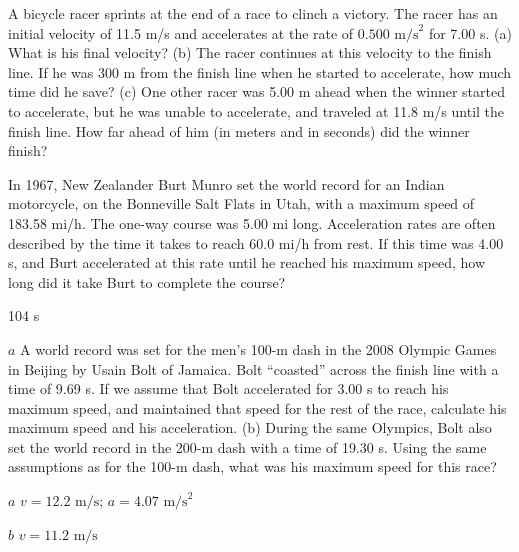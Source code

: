 \documentclass[
]{book}
\newenvironment{problems-exercises}{}{}
\begin{document}
\begin{problems-exercises}
\hypertarget{fs-id1164906479070}{}
\leavevmode\hypertarget{fs-id1164906479073}{}%
A bicycle racer sprints at the end of a race to clinch a victory. The
racer has an initial velocity of 11.5 m/s and accelerates at the rate of
\({0\text{.}\text{500\ m/s}^{2}}{}\) for 7.00 s. (a) What is his final
velocity? (b) The racer continues at this velocity to the finish line.
If he was 300 m from the finish line when he started to accelerate, how
much time did he save? (c) One other racer was 5.00 m ahead when the
winner started to accelerate, but he was unable to accelerate, and
traveled at 11.8 m/s until the finish line. How far ahead of him (in
meters and in seconds) did the winner finish?

\hypertarget{fs-id1164906433774}{}
\leavevmode\hypertarget{fs-id1164906433777}{}%
In 1967, New Zealander Burt Munro set the world record for an Indian
motorcycle, on the Bonneville Salt Flats in Utah, with a maximum speed
of 183.58 mi/h. The one-way course was 5.00 mi long. Acceleration rates
are often described by the time it takes to reach 60.0 mi/h from rest.
If this time was 4.00 s, and Burt accelerated at this rate until he
reached his maximum speed, how long did it take Burt to complete the
course?

\leavevmode\hypertarget{fs-id1164906433797}{}%
104 s

\hypertarget{fs-id1164906508150}{}
\leavevmode\hypertarget{fs-id1164906508153}{}%
\(a\) A world record was set for the men's 100-m dash in the 2008
Olympic Games in Beijing by Usain Bolt of Jamaica. Bolt ``coasted'' across
the finish line with a time of 9.69 s. If we assume that Bolt
accelerated for 3.00 s to reach his maximum speed, and maintained that
speed for the rest of the race, calculate his maximum speed and his
acceleration. (b) During the same Olympics, Bolt also set the world
record in the 200-m dash with a time of 19.30 s. Using the same
assumptions as for the 100-m dash, what was his maximum speed for this
race?

\leavevmode\hypertarget{fs-id1164906508162}{}%
\(a\) \({{v = \text{12}}\text{.}\text{2\ m/s}}{}\);
\({{a = 4}\text{.}\text{07\ m/s}^{2}}{}\)

\(b\) \({{v = \text{11}}\text{.}\text{2\ m/s}}{}\)

\end{problems-exercises}
\end{document}
